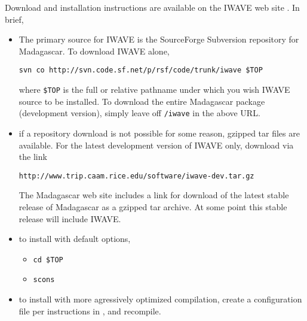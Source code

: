 Download and installation instructions are available on the IWAVE web
site \cite[]{IWAVE}. In brief,
\begin{itemize}
\item The primary source for IWAVE is the SourceForge Subversion repository for
  Madagascar. To download IWAVE alone,
\begin{verbatim}
svn co http://svn.code.sf.net/p/rsf/code/trunk/iwave $TOP
\end{verbatim}
where {\tt \$TOP} is the full or relative pathname under which you
wish IWAVE source to be installed. To download the entire Madagascar
package (development version), simply leave off {\tt /iwave} in the
above URL. 
\item if a repository download is not possible for some reason,
  gzipped tar files are available. For the latest development version
  of IWAVE only, download via the link
\begin{verbatim}
http://www.trip.caam.rice.edu/software/iwave-dev.tar.gz
\end{verbatim}
The Madagascar web site includes a link for
download of the latest stable release of Madagascar as a gzipped
tar archive. At some point this stable release will include IWAVE.
\item to install with default options, 
\begin{itemize}
\item {\tt cd \$TOP}
\item {\tt scons}
\end{itemize}
\item to install with more agressively optimized compilation, create a
  configuration file per instructions in \cite[]{IWAVE}, and
  recompile.
\end{itemize}
